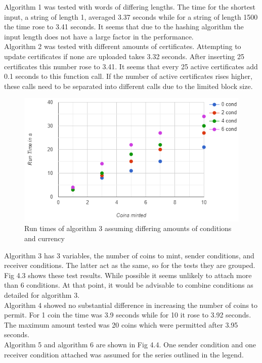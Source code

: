 Algorithm 1 was tested with words of differing lengths. The time for the shortest input, a string of length 1, averaged 3.37 seconds while for a string of length 1500 the time rose to 3.41 seconds. It seems that due to the hashing algorithm the input length does not have a large factor in the performance.\\
Algorithm 2 was tested with different amounts of certificates. Attempting to update certificates if none are uploaded takes 3.32 seconds. After inserting 25 certificates this number rose to 3.41. It seems that every 25 active certificates add 0.1 seconds to this function call. If the number of active certificates rises higher, these calls need to be separated into different calls due to the limited block size.\\
\begin{figure}[H]
    \centering
    \includegraphics[scale=0.7]{figures/4.3.png}  
    \caption{Run times of algorithm 3 assuming differing amounts of conditions and currency}
    \label{fig:testalgo3}
\end{figure}
Algorithm 3 has 3 variables, the number of coins to mint, sender conditions, and receiver conditions. The latter act as the same, so for the tests they are grouped. Fig 4.3 shows these test results. While possible it seems unlikely to attach more than 6 conditions. At that point, it would be advisable to combine conditions as detailed for algorithm 3.\\
Algorithm 4 showed no substantial difference in increasing the number of coins to permit. For 1 coin the time was 3.9 seconds while for 10 it rose to 3.92 seconds. The maximum amount tested was 20 coins which were permitted after 3.95 seconds.\\
Algorithm 5 and algorithm 6 are shown in Fig 4.4. One sender condition and one receiver condition attached was assumed for the series outlined in the legend.
